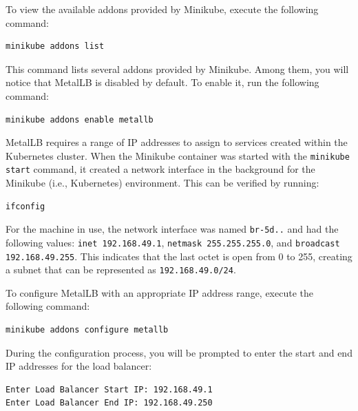 To view the available addons provided by Minikube, execute the following command:

\begin{lstlisting}[breaklines=true,basicstyle=\small\ttfamily,frame=single]
minikube addons list
\end{lstlisting}

This command lists several addons provided by Minikube. Among them, you will notice that MetalLB is disabled by default. To enable it, run the following command:

\begin{lstlisting}[breaklines=true,basicstyle=\small\ttfamily,frame=single]
minikube addons enable metallb
\end{lstlisting}

MetalLB requires a range of IP addresses to assign to services created within the Kubernetes cluster. When the Minikube container was started with the \texttt{minikube start} command, it created a network interface in the background for the Minikube (i.e., Kubernetes) environment. This can be verified by running:

\begin{lstlisting}[breaklines=true,basicstyle=\small\ttfamily,frame=single]
ifconfig
\end{lstlisting}

For the machine in use, the network interface was named \texttt{br-5d..} and had the following values: \texttt{inet 192.168.49.1}, \texttt{netmask 255.255.255.0}, and \texttt{broadcast 192.168.49.255}. This indicates that the last octet is open from 0 to 255, creating a subnet that can be represented as \texttt{192.168.49.0/24}.

To configure MetalLB with an appropriate IP address range, execute the following command:

\begin{lstlisting}[breaklines=true,basicstyle=\small\ttfamily,frame=single]
minikube addons configure metallb
\end{lstlisting}

During the configuration process, you will be prompted to enter the start and end IP addresses for the load balancer:

\begin{lstlisting}[breaklines=true,basicstyle=\small\ttfamily,frame=single]
Enter Load Balancer Start IP: 192.168.49.1
Enter Load Balancer End IP: 192.168.49.250
\end{lstlisting}

